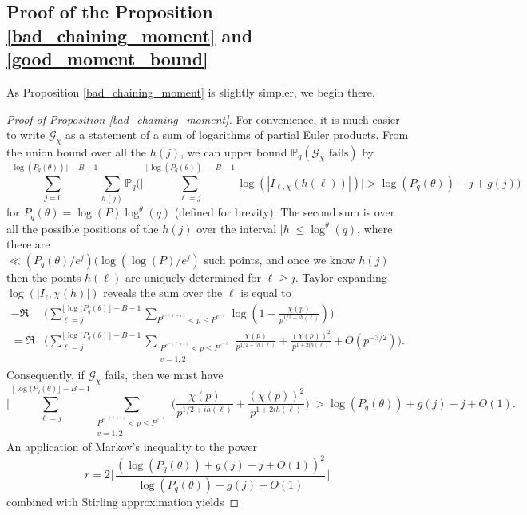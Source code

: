 \documentclass[reqno]{amsart}
\theoremstyle{definition}
\theoremstyle{remark}
\numberwithin{equation}{section}
\theoremstyle{remark}
\begin{document}
\subsection{Proof of the Proposition \ref{bad_chaining_moment}  and \ref{good_moment_bound}} As Proposition \ref{bad_chaining_moment} is slightly simpler, we begin there.
\begin{proof}[Proof of Proposition \ref{bad_chaining_moment}]
    For convenience, it is much easier to write $\mathcal{G}_\chi$ as a statement of a sum of logarithms of partial Euler products. From the union bound over all the $h(j)$, we can upper bound $\mathbb{P}_{q}(\mathcal{G}_\chi \text{ fails})$ by
    \begin{equation}
        \sum_{j=0}^{\lfloor\log(P_q(\theta))\rfloor -B-1}\sum_{h(j)}\mathbb{P}_q\big(\big|\sum_{\ell=j}^{\lfloor\log(P_q(\theta))\rfloor -B-1}\log(|I_{\ell,\chi}(h(\ell))|)\big|>\log(P_q(\theta)) -j + g(j)\big) \label{union_fail}
    \end{equation}
    for $P_q(\theta) = \log(P)\log^\theta(q)$ (defined for brevity). The second sum is over all the possible positions of the $h(j)$ over the interval $|h| \leq \log^\theta(q)$, where there are \\ $\ll (P_q(\theta)/e^j)(\log(\log(P)/e^j)$ such points, and once we know $h(j)$ then the points $h(\ell)$ are uniquely determined for $\ell \geq j$. Taylor expanding $\log(|I_\ell,\chi(h)|)$ reveals the sum over the $\ell$ is equal to
    \begin{align*}
        -\Re&\big(\sum_{\ell=j}^{\lfloor\log(P_q(\theta)\rfloor - B -1}\sum_{P^{e^{-(\ell+1)}} < p \leq P^{e^{-\ell}}}\log(1-\frac{\chi(p)}{p^{1/2+ih(\ell)}})\big) \\
        =\Re&\big(\sum_{\ell=j}^{\lfloor\log(P_q(\theta)\rfloor - B -1}\sum_{\substack{P^{e^{-(\ell+1)}} < p \leq P^{e^{-\ell}} \\ v=1,2}}\frac{\chi(p)}{p^{1/2+ih(\ell)}}+\frac{(\chi(p))^2}{p^{1+2ih(\ell)}}+O(p^{-3/2})\big).
    \end{align*}
    Consequently, if $\mathcal{G}_\chi$ fails, then we must have
    $$\big|\sum_{\ell=j}^{\lfloor\log(P_q(\theta)\rfloor - B -1}\sum_{\substack{P^{e^{-(\ell+1)}} < p \leq P^{e^{-\ell}} \\ v=1,2}}\big(\frac{\chi(p)}{p^{1/2+ih(\ell)}}+\frac{(\chi(p))^2}{p^{1+2ih(\ell)}}\big)\big| > \log(P_q(\theta)) + g(j)-j+O(1).$$
    An application of Markov's inequality to the power $$r=2\big\lfloor\frac{(\log(P_q(\theta))+g(j)-j+O(1))^2}{\log(P_q(\theta))-g(j)+O(1)}\big\rfloor$$
    combined with Stirling approximation yields

\end{proof}
\end{document}
